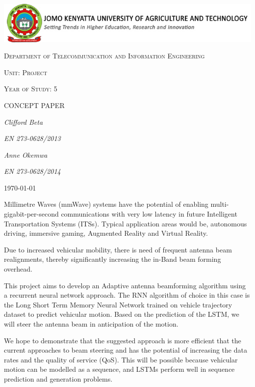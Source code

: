 \documentclass[12pt,a4paper]{article}
\begin{document}
\begin{titlepage}
	\centering
	\includegraphics[width=1.2\textwidth]{src/logo-jkuat.jpg}\par\vspace{1cm}
	\vspace{1cm}
	{\scshape\Large Department of Telecommunication and Information Engineering\par}
	\vspace{1cm}
	{\scshape\Large Unit: Project\par}
	\vspace{1cm}
	{\scshape\Large Year of Study: 5\par}
	\vspace{1cm}
	{\scshape\Large CONCEPT PAPER\par}
	\vspace{1cm}
	
	
	{\Large\itshape Clifford Beta \par}
	{\Large\itshape EN 273-0628/2013\par}
	{\Large\itshape Anne Okemwa \par}
	{\Large\itshape EN 273-0628/2014\par}
	\vfill




	{\large \today\par}

\end{titlepage}
\newpage
Millimetre Waves (mmWave) systems have the potential of enabling multi-gigabit-per-second communications with very low latency in future Intelligent Transportation Systems (ITSs). Typical application areas would be, autonomous driving, immersive gaming, Augmented Reality and Virtual Reality.

Due to increased vehicular mobility, there is need of frequent antenna beam realignments, thereby significantly increasing the in-Band beam forming overhead.

This project aims to develop an Adaptive antenna beamforming algorithm using a recurrent neural network approach. The RNN algorithm of choice in this case is the Long Short Term Memory Neural Network trained on vehicle trajectory dataset to predict vehicular motion.
Based on the prediction of the LSTM, we will steer the antenna beam in anticipation of the motion.

We hope to demonstrate that the suggested approach is more efficient that the current approaches to beam steering and has the potential of increasing the data rates and the quality of service (QoS). This will be possible because vehicular motion can be modelled as a sequence, and LSTMs perform well in sequence prediction and generation problems. 
\end{document}
